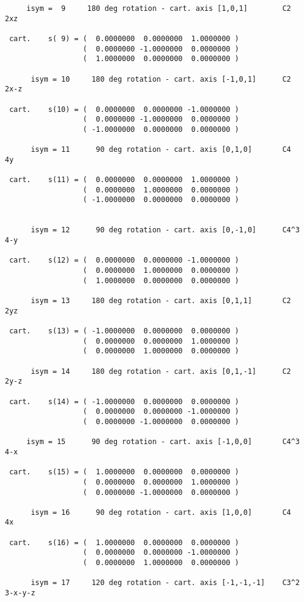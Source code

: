 \documentclass[12pt,a4paper]{article}
\begin{document}
\begin{footnotesize}
\begin{verbatim}
     isym =  9     180 deg rotation - cart. axis [1,0,1]        C2    2xz

 cart.    s( 9) = (  0.0000000  0.0000000  1.0000000 )
                  (  0.0000000 -1.0000000  0.0000000 )
                  (  1.0000000  0.0000000  0.0000000 )

      isym = 10     180 deg rotation - cart. axis [-1,0,1]      C2    2x-z

 cart.    s(10) = (  0.0000000  0.0000000 -1.0000000 )
                  (  0.0000000 -1.0000000  0.0000000 )
                  ( -1.0000000  0.0000000  0.0000000 )

      isym = 11      90 deg rotation - cart. axis [0,1,0]       C4    4y

 cart.    s(11) = (  0.0000000  0.0000000  1.0000000 )
                  (  0.0000000  1.0000000  0.0000000 )
                  ( -1.0000000  0.0000000  0.0000000 )


      isym = 12      90 deg rotation - cart. axis [0,-1,0]      C4^3   4-y

 cart.    s(12) = (  0.0000000  0.0000000 -1.0000000 )
                  (  0.0000000  1.0000000  0.0000000 )
                  (  1.0000000  0.0000000  0.0000000 )

      isym = 13     180 deg rotation - cart. axis [0,1,1]       C2     2yz

 cart.    s(13) = ( -1.0000000  0.0000000  0.0000000 )
                  (  0.0000000  0.0000000  1.0000000 )
                  (  0.0000000  1.0000000  0.0000000 )

      isym = 14     180 deg rotation - cart. axis [0,1,-1]      C2     2y-z

 cart.    s(14) = ( -1.0000000  0.0000000  0.0000000 )
                  (  0.0000000  0.0000000 -1.0000000 )
                  (  0.0000000 -1.0000000  0.0000000 )

     isym = 15      90 deg rotation - cart. axis [-1,0,0]       C4^3   4-x

 cart.    s(15) = (  1.0000000  0.0000000  0.0000000 )
                  (  0.0000000  0.0000000  1.0000000 )
                  (  0.0000000 -1.0000000  0.0000000 )

      isym = 16      90 deg rotation - cart. axis [1,0,0]       C4     4x

 cart.    s(16) = (  1.0000000  0.0000000  0.0000000 )
                  (  0.0000000  0.0000000 -1.0000000 )
                  (  0.0000000  1.0000000  0.0000000 )

      isym = 17     120 deg rotation - cart. axis [-1,-1,-1]    C3^2   3-x-y-z


\end{verbatim}
\end{footnotesize}
\end{document}
